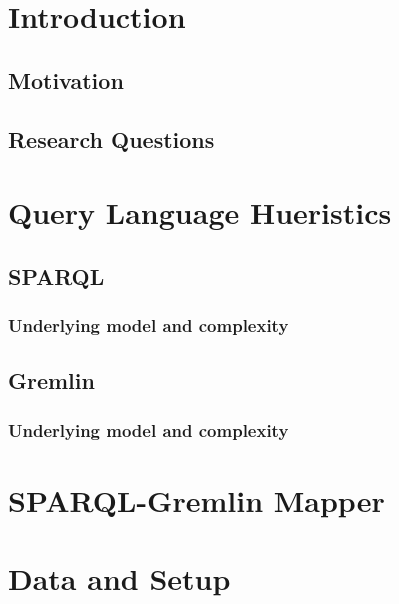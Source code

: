 \documentclass{sig-alternate-05-2015}
\begin{document}
%
%

%
%
\printccsdesc



\section{Introduction}
\subsection{Motivation}
\subsection{Research Questions}

\section{Query Language Hueristics}
\subsection{SPARQL}
\subsubsection{Underlying model and complexity}
\subsection{Gremlin}
\subsubsection{Underlying model and complexity}

\section{SPARQL-Gremlin Mapper}


\section{Data and Setup}
\end{document}
